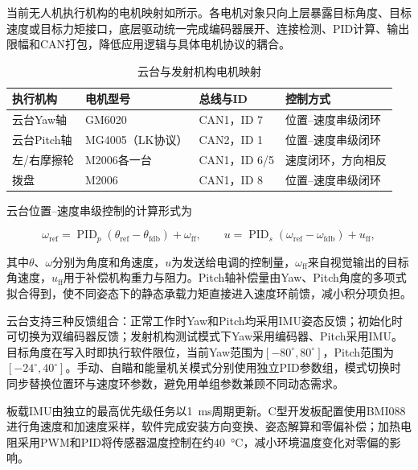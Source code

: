 当前无人机执行机构的电机映射如所示。各电机对象只向上层暴露目标角度、目标速度或目标力矩接口，底层驱动统一完成编码器展开、连接检测、PID计算、输出限幅和CAN打包，降低应用逻辑与具体电机协议的耦合。

\begin{table}[hbtp!]
    \centering
    \begin{tabular}{m{3.0cm} m{3.1cm} m{3.2cm} m{4.3cm}}
    \toprule
    执行机构 & 电机型号 & 总线与ID & 控制方式 \\
    \midrule
    云台Yaw轴 & GM6020 & CAN1，ID 7 & 位置--速度串级闭环 \\
    \midrule
    云台Pitch轴 & MG4005（LK协议） & CAN2，ID 1 & 位置--速度串级闭环 \\
    \midrule
    左/右摩擦轮 & M2006各一台 & CAN1，ID 6/5 & 速度闭环，方向相反 \\
    \midrule
    拨盘 & M2006 & CAN1，ID 8 & 位置--速度串级闭环 \\
    \bottomrule
    \end{tabular}
    \caption{云台与发射机构电机映射}
    \label{tab:drone_motor_mapping}
\end{table}

云台位置--速度串级控制的计算形式为

\begin{equation}
    \omega_{\mathrm{ref}}
    =\operatorname{PID}_{p}(\theta_{\mathrm{ref}}-\theta_{\mathrm{fdb}})
    +\omega_{\mathrm{ff}},\qquad
    u=\operatorname{PID}_{s}(\omega_{\mathrm{ref}}-\omega_{\mathrm{fdb}})
    +u_{\mathrm{ff}},
    \label{equ:drone_gimbal_cascade_pid}
\end{equation}

其中$\theta$、$\omega$分别为角度和角速度，$u$为发送给电调的控制量，$\omega_{\mathrm{ff}}$来自视觉输出的目标角速度，$u_{\mathrm{ff}}$用于补偿机构重力与阻力。Pitch轴补偿量由Yaw、Pitch角度的多项式拟合得到，使不同姿态下的静态承载力矩直接进入速度环前馈，减小积分项负担。

云台支持三种反馈组合：正常工作时Yaw和Pitch均采用IMU姿态反馈；初始化时可切换为双编码器反馈；发射机构测试模式下Yaw采用编码器、Pitch采用IMU。目标角度在写入时即执行软件限位，当前Yaw范围为$[-80^\circ,80^\circ]$，Pitch范围为$[-24^\circ,40^\circ]$。手动、自瞄和能量机关模式分别使用独立PID参数组，模式切换时同步替换位置环与速度环参数，避免用单组参数兼顾不同动态需求。

板载IMU由独立的最高优先级任务以\qty{1}{\milli\second}周期更新。C型开发板配置使用BMI088进行角速度和加速度采样，软件完成安装方向变换、姿态解算和零偏补偿；加热电阻采用PWM和PID将传感器温度控制在约\qty{40}{\degreeCelsius}，减小环境温度变化对零偏的影响。

